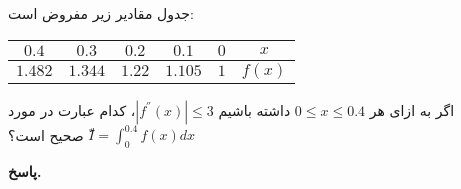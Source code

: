 جدول مقادیر زیر مفروض است:
\vspace*{-.5cm}
\begin{center}
		\begin{tabular}{ccccc|c}
		\(0.4\) & \(0.3\) &\(0.2\)&\(0.1\) & \(0\) & \(x\)\\
		\midrule
		\(1.482\)	& \(1.344\) & \(1.22\) & \(1.105\) &\( 1\) & \(f(x)\)
	\end{tabular}
\end{center}
اگر به ازای  هر 
\(0\leq x \leq 0.4\)
داشته باشیم
\(|f^{''}(x)| \leq 3\)،
 کدام عبارت در مورد 
\(ّI = \int_{0}^{0.4} f(x) dx\)
صحیح است؟

\begin{answer}

	\textbf{پاسخ.}
	
\end{answer}
